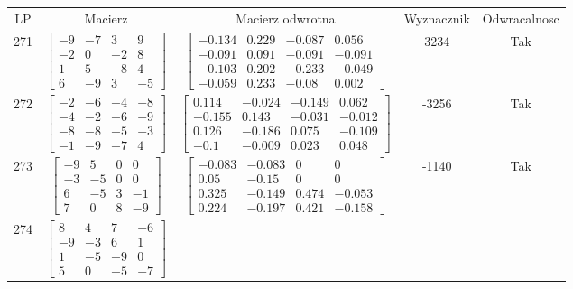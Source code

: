 \documentclass[a4paper,12pt]{article}
\begin{document}
\bgroup {} \vspace{0.2in} \begin{tabular}{c c c c c}
LP & Macierz & Macierz odwrotna & Wyznacznik & Odwracalnosc\\
271
&
$\begin{bmatrix} -9 & -7 & 3 & 9 \\ -2 & 0 & -2 & 8 \\ 1 & 5 & -8 & 4 \\ 6 & -9 & 3 & -5 \end{bmatrix}$
&
$\begin{bmatrix} -0.134 & 0.229 & -0.087 & 0.056 \\ -0.091 & 0.091 & -0.091 & -0.091 \\ -0.103 & 0.202 & -0.233 & -0.049 \\ -0.059 & 0.233 & -0.08 & 0.002 \end{bmatrix}$
&
3234
&
Tak
\\
272
&
$\begin{bmatrix} -2 & -6 & -4 & -8 \\ -4 & -2 & -6 & -9 \\ -8 & -8 & -5 & -3 \\ -1 & -9 & -7 & 4 \end{bmatrix}$
&
$\begin{bmatrix} 0.114 & -0.024 & -0.149 & 0.062 \\ -0.155 & 0.143 & -0.031 & -0.012 \\ 0.126 & -0.186 & 0.075 & -0.109 \\ -0.1 & -0.009 & 0.023 & 0.048 \end{bmatrix}$
&
-3256
&
Tak
\\
273
&
$\begin{bmatrix} -9 & 5 & 0 & 0 \\ -3 & -5 & 0 & 0 \\ 6 & -5 & 3 & -1 \\ 7 & 0 & 8 & -9 \end{bmatrix}$
&
$\begin{bmatrix} -0.083 & -0.083 & 0 & 0 \\ 0.05 & -0.15 & 0 & 0 \\ 0.325 & -0.149 & 0.474 & -0.053 \\ 0.224 & -0.197 & 0.421 & -0.158 \end{bmatrix}$
&
-1140
&
Tak
\\
274
&
$\begin{bmatrix} 8 & 4 & 7 & -6 \\ -9 & -3 & 6 & 1 \\ 1 & -5 & -9 & 0 \\ 5 & 0 & -5 & -7 \end{bmatrix}$

\end{tabular}
\end{document}
